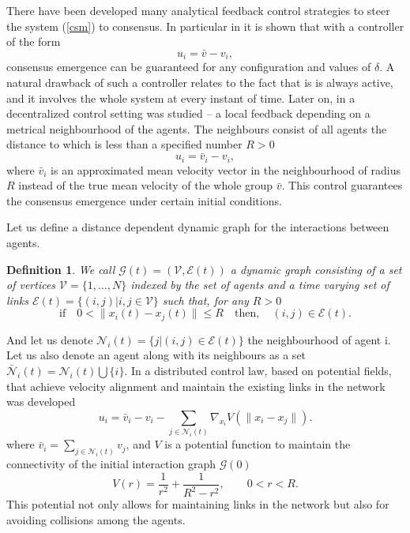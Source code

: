 \documentclass[a4paper,10pt, english]{article}
\newtheorem{dfn}{Definition}[section]
\begin{document}
There have been developed many analytical feedback control strategies  to steer the system (\ref{csm}) to consensus. In particular in \cite{cftp} it is shown that with a controller 
of the form
$$
u_i = \bar{v} - v_i,
$$
consensus emergence can be guaranteed for any configuration and values of $\delta$. A natural drawback of such a controller relates to the fact that is is always active, and it involves the whole system at every
instant of time. Later on,  in \cite{bfk} a decentralized control setting  was studied \--- a local feedback depending on a metrical neighbourhood of the agents. The neighbours consist of all agents 
the distance to which is less than a specified number $R>0$
\begin{equation}
u_i = \bar{v}_i - v_i,
\label{bfk}
\end{equation}
where $\bar{v}_i$ is an approximated mean velocity vector in the neighbourhood of radius $R$ instead of the true mean velocity of the whole group $\bar{v}$. This control guarantees the consensus emergence under certain initial conditions.




Let us define a distance dependent dynamic graph for the interactions between agents.
\begin{dfn}
We call $\mathcal{G}(t) =  (\mathcal{V}, \mathcal{E}(t) )$ a dynamic graph consisting of a set of vertices $\mathcal{V} = \{1, \dots,  N\}$ indexed by the set of agents and a time varying set of links 
$\mathcal{E}(t) = \{(i, j)|i, j \in \mathcal{V}\}$ such that, for any $R>0$
$$
\mbox{if}\quad 0<\|x_i(t) - x_j(t)\| \leq R \quad\mbox{then},\quad (i, j)\in \mathcal{E}(t).
$$
\end{dfn}
And let us denote $\mathcal{N}_i(t) = \{j|(i, j)\in\mathcal{E}(t)\}$ the neighbourhood of agent i.
Let us also denote an agent along with its neighbours as a set $\bar{\mathcal{N}}_i(t) = \mathcal{N}_i(t)\bigcup \{i\}$.
In \cite{jfwpc} a distributed control law, based on potential fields, that achieve velocity alignment and maintain the existing links in the network was developed 
\begin{equation}
u_i = \bar{v}_i - v_i - \sum_{j \in \mathcal{N}_i(t)}\nabla_{x_i}V(\|x_i - x_j\|).
\label{controljad}
\end{equation}
where $\bar{v}_i = \sum_{j \in \mathcal{N}_i(t)} v_j$, and $V$ is a potential function  to maintain the connectivity of the initial interaction graph $\mathcal{G}(0)$ 
\begin{equation}
 V(r) = \frac{1}{r^2} + \frac{1}{R^2 - r^2}, \qquad 0 < r < R.
\label{potential}
\end{equation}
This potential not only allows for maintaining links in the network but also for avoiding collisions among the agents. 
\end{document}
